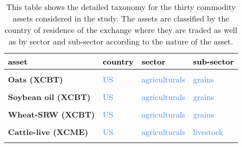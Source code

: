\documentclass[
  authoryear,
  preprint,
  3p]{elsarticle}
\begin{document}
\begin{longtable}[t]{>{}l>{}l>{}l>{}l}

\caption{\label{tbl-assets-taxonomy}This table shows the detailed
taxonomy for the thirty commodity assets considered in the study. The
assets are classified by the country of residence of the exchange where
they are traded as well as by sector and sub-sector according to the
nature of the asset.}

\tabularnewline

\toprule
\textcolor{black}{\textbf{asset}} & \textcolor{black}{\textbf{country}} & \textcolor{black}{\textbf{sector}} & \textcolor{black}{\textbf{sub-sector}}\\
\midrule
\textbf{\cellcolor{gray!10}{Corn-\#2 yellow (XCBT)}} & \textcolor[HTML]{4285f4}{\cellcolor{gray!10}{US}} & \textcolor[HTML]{4285f4}{\cellcolor{gray!10}{agriculturals}} & \textcolor[HTML]{4285f4}{\cellcolor{gray!10}{grains}}\\
\textbf{Oats (XCBT)} & \textcolor[HTML]{4285f4}{US} & \textcolor[HTML]{4285f4}{agriculturals} & \textcolor[HTML]{4285f4}{grains}\\
\textbf{\cellcolor{gray!10}{Soybean meal (XCBT)}} & \textcolor[HTML]{4285f4}{\cellcolor{gray!10}{US}} & \textcolor[HTML]{4285f4}{\cellcolor{gray!10}{agriculturals}} & \textcolor[HTML]{4285f4}{\cellcolor{gray!10}{grains}}\\
\textbf{Soybean oil (XCBT)} & \textcolor[HTML]{4285f4}{US} & \textcolor[HTML]{4285f4}{agriculturals} & \textcolor[HTML]{4285f4}{grains}\\
\textbf{\cellcolor{gray!10}{Soybeans (XCBT)}} & \textcolor[HTML]{4285f4}{\cellcolor{gray!10}{US}} & \textcolor[HTML]{4285f4}{\cellcolor{gray!10}{agriculturals}} & \textcolor[HTML]{4285f4}{\cellcolor{gray!10}{grains}}\\
\addlinespace
\textbf{Wheat-SRW (XCBT)} & \textcolor[HTML]{4285f4}{US} & \textcolor[HTML]{4285f4}{agriculturals} & \textcolor[HTML]{4285f4}{grains}\\
\textbf{\cellcolor{gray!10}{Cattle-feeder (XCME)}} & \textcolor[HTML]{4285f4}{\cellcolor{gray!10}{US}} & \textcolor[HTML]{4285f4}{\cellcolor{gray!10}{agriculturals}} & \textcolor[HTML]{4285f4}{\cellcolor{gray!10}{livestock}}\\
\textbf{Cattle-live (XCME)} & \textcolor[HTML]{4285f4}{US} & \textcolor[HTML]{4285f4}{agriculturals} & \textcolor[HTML]{4285f4}{livestock}\\
\textbf{\cellcolor{gray!10}{Lean hogs (XCME)}} & \textcolor[HTML]{4285f4}{\cellcolor{gray!10}{US}} & \textcolor[HTML]{4285f4}{\cellcolor{gray!10}{agriculturals}} & \textcolor[HTML]{4285f4}{\cellcolor{gray!10}{livestock}}\\

\end{longtable}
\end{document}
